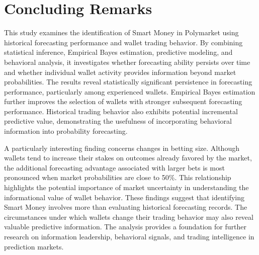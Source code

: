 \section{Concluding Remarks}\label{sec:conclusion}

This study examines the identification of Smart Money in Polymarket using historical forecasting performance and wallet trading behavior. By combining statistical inference, Empirical Bayes estimation, predictive modeling, and behavioral analysis, it investigates whether forecasting ability persists over time and whether individual wallet activity provides information beyond market probabilities. The results reveal statistically significant persistence in forecasting performance, particularly among experienced wallets. Empirical Bayes estimation further improves the selection of wallets with stronger subsequent forecasting performance. Historical trading behavior also exhibits potential incremental predictive value, demonstrating the usefulness of incorporating behavioral information into probability forecasting.

A particularly interesting finding concerns changes in betting size. Although wallets tend to increase their stakes on outcomes already favored by the market, the additional forecasting advantage associated with larger bets is most pronounced when market probabilities are close to 50\%. This relationship highlights the potential importance of market uncertainty in understanding the informational value of wallet behavior. These findings suggest that identifying Smart Money involves more than evaluating historical forecasting records. The circumstances under which wallets change their trading behavior may also reveal valuable predictive information. The analysis provides a foundation for further research on information leadership, behavioral signals, and trading intelligence in prediction markets.
